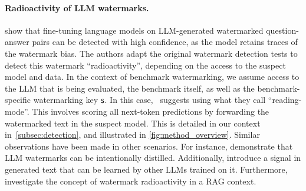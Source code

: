 \paragraph{\textbf{Radioactivity of LLM watermarks.}}
\citet{sander2024watermarking} show that fine-tuning language models on LLM-generated watermarked question-answer pairs can be detected with high confidence, as the model retains traces of the watermark bias. 
The authors adapt the original watermark detection tests to detect this watermark ``radioactivity'', depending on the access to the suspect model and data.
In the context of benchmark watermarking, we assume access to the LLM that is being evaluated, the benchmark itself, as well as the benchmark-specific watermarking key $\mathsf{s}$.
In this case,~\citet{sander2024watermarking} suggests using what they call ``reading-mode''. 
This involves scoring all next-token predictions by forwarding the watermarked text in the suspect model.
This is detailed in our context in~\autoref{subsec:detection}, and illustrated in \autoref{fig:method_overview}.
Similar observations have been made in other scenarios.
For instance, \citet{gu2023learnability} demonstrate that LLM watermarks can be intentionally distilled. 
Additionally, \citet{zhao2023protecting} introduce a signal in generated text that can be learned by other LLMs trained on it. Furthermore, \citet{jovanovic2024ward} investigate the concept of watermark radioactivity in a RAG context.
% 







